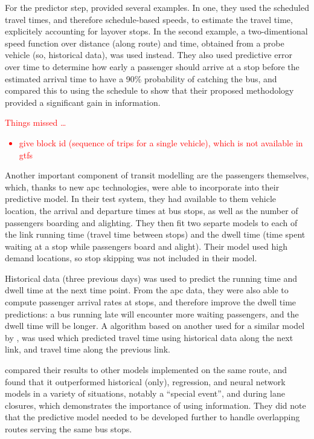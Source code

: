 For the predictor step, \cite{Cathey_2003} provided several examples.
In one, they used the scheduled travel times,
and therefore schedule-based speeds,
to estimate the travel time, explicitely accounting for layover stops.
In the second example,
a two-dimentional speed function over distance (along route) and time,
obtained from a probe vehicle (so, historical data),
was used instead.
They also used predictive error over time to determine
how early a passenger should arrive at a stop
before the estimated arrival time to have a 90\% probability of catching the bus,
and compared this to using the schedule to show that their proposed methodology
provided a significant gain in information.

\textcolor{red}{
    \singlespacing
    Things missed \ldots
    \begin{itemize}
        \item give block id (sequence of trips for a single vehicle),
            which is not available in \gls{gtfs}
    \end{itemize}
}



Another important component of transit modelling are the passengers themselves,
which, thanks to new \gls{apc} technologies,
\cite{Shalaby_2004} were able to incorporate into their predictive model.
In their test system,
they had available to them vehicle location,
the arrival and departure times at bus stops,
as well as the number of passengers boarding and alighting.
They then fit two separte \kf{} models to each of the
link running time (travel time between stops)
and the dwell time (time spent waiting at a stop while passengers
board and alight).
Their model used high demand locations,
so stop skipping was not included in their model.


Historical data (three previous days) was used to predict the
running time and dwell time at the next time point.
From the \gls{apc} data, they were also able to compute
passenger arrival rates at stops,
and therefore improve the dwell time predictions:
a bus running late will encounter more waiting passengers,
and the dwell time will be longer.
A \kf{} algorithm based on another used for a similar model
by \cite{Reinhoudt_1997},
was used which predicted travel time using historical data
along the next link,
and travel time along the previous link.


\cite{Shalaby_2004} compared their \kf{} results to other models
implemented on the same route,
and found that it outperformed historical (only),
regression, and neural network models in a variety of situations,
notably a ``special event'', and during lane closures,
which demonstrates the importance of using \rt{} information.
They did note that the predictive model needed to be developed
further to handle overlapping routes serving the same bus stops.


